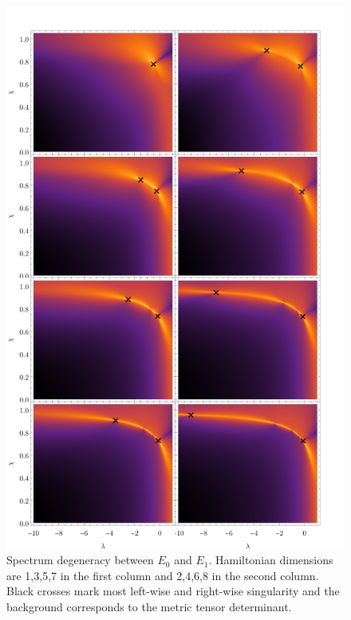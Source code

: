 
\begin{figure}[h]
    \centering
    \includegraphics{../img/singularitiesPlots.pdf}
    \caption{Spectrum degeneracy between $E_0$ and $E_1$. Hamiltonian dimensions are 1,3,5,7 in the first column and 2,4,6,8 in the second column. Black crosses mark most left-wise and right-wise singularity and the background corresponds to the metric tensor determinant.}
    \label{fig:singularities3to10}    
\end{figure}




